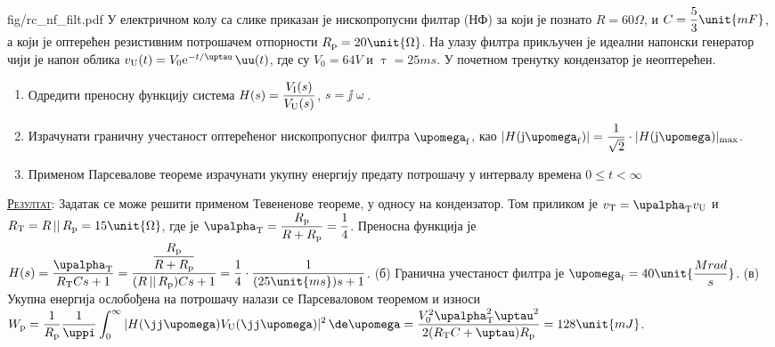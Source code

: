 \mnDifficult
\begin{slikaDesno}[0.833]{fig/rc_nf_filt.pdf}
\PID 
У електричном колу са слике 
приказан је нископропусни филтар
(НФ)
за који је познато
$R = {60}\unit{\Omega}$,  и 
${C = \dfrac{5}{3}\unit{mF}}
\vspace*{1mm}
$, а 
који је оптерећен резистивним потрошачем
отпорности
$R_{\rm p} = 20\unit{\Omega}
\vspace*{1mm}$. На улазу филтра прикључен 
је идеални напонски генератор чији 
је напон облика 
${v_{\rm U}(t) = V_0 
{\rm e}^{-t/\uptau}\,\uu(t)}$, где су
$V_0 = 64\unit{V}$ и 
$\uptau = 25\unit{ms}$. У почетном тренутку
кондензатор је неоптерећен.
\end{slikaDesno}

\begin{enumerate}[label=(\alph*)]
    \item Одредити преносну функцију система 
    $H(s) = \dfrac{V_{\rm I}(s)}{V_{\rm U}(s)}$, $s = \jj\upomega$.
    \item  
    Израчунати граничну учестаност 
    оптерећеног нископропусног
    филтра  $\upomega_{\rm f}$, као 
    $|H({\rm j}\upomega_{\rm f})| = \dfrac{1}{\sqrt 2} 
    \cdot |H({\rm j}\upomega)|_{\rm max}$.
    \item
    Применом Парсевалове теореме израчунати
    укупну енергију предату потрошачу 
    у интервалу времена $0 \leq t < \infty$
\end{enumerate} 

\textsc{\underline{Резултат}:} 
Задатак се може решити применом Тевененове теореме, у односу
на кондензатор. 
Том приликом је $v_{\rm T} = \upalpha_{\rm T} v_{\rm U}$ и
$R_{\rm T} = R\,||\,R_{\rm p} 
= 15\unit{\Omega}$, где је 
$\upalpha_{\rm T} = \dfrac{R_{\rm p}}{R + R_{\rm p}}
= \dfrac{1}{4}$. Преносна функција је 
$H(s) = \dfrac{\upalpha_{\rm T}}{
R_{\rm T}Cs + 1} =  
\dfrac{ \dfrac{R_{\rm p}}{R + R_{\rm p}} }{
(R\,||\,R_{\rm p})Cs + 1
} =
\dfrac{1}{4} \cdot
\dfrac{1}{  (25\unit{ms}) s + 1  }$. 
(б) Гранична учестаност филтра је 
$\upomega_{\rm f} = 40\unit{\dfrac{Mrad}{s}}$.
(в) Укупна енергија ослобођена на потрошачу 
налази се Парсеваловом теоремом и износи
$\displaystyle
W_{\rm p} = 
\dfrac{1}{R_{\rm p}}
\dfrac{1}{\uppi} 
\int_0^{\infty}
|H(\jj\upomega)V_{\rm U}(\jj\upomega)|^2\,
\de\upomega = 
\dfrac{V_0^2 \upalpha_{\rm T}^2 \uptau^2}{
2(R_{\rm T}C + \uptau)R_{\rm p}} = 
128\unit{mJ}
$.